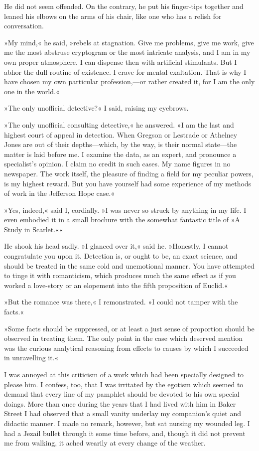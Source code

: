 He did not seem offended. On the contrary, he put his finger-tips together and leaned his elbows on the arms of his chair, like one who has a relish for conversation.

»My mind,« he said, »rebels at stagnation. Give me problems, give me work, give me the most abstruse cryptogram or the most intricate analysis, and I am in my own proper atmosphere. I can dispense then with artificial stimulants. But I abhor the dull routine of existence. I crave for mental exaltation. That is why I have chosen my own particular profession,—or rather created it, for I am the only one in the world.«

»The only unofficial detective?« I said, raising my eyebrows.

»The only unofficial consulting detective,« he answered. »I am the last and highest court of appeal in detection. When Gregson or Lestrade or Athelney Jones are out of their depths—which, by the way, is their normal state—the matter is laid before me. I examine the data, as an expert, and pronounce a specialist's opinion. I claim no credit in such cases. My name figures in no newspaper. The work itself, the pleasure of finding a field for my peculiar powers, is my highest reward. But you have yourself had some experience of my methods of work in the Jefferson Hope case.«

»Yes, indeed,« said I, cordially. »I was never so struck by anything in my life. I even embodied it in a small brochure with the somewhat fantastic title of »A Study in Scarlet.««

He shook his head sadly. »I glanced over it,« said he. »Honestly, I cannot congratulate you upon it. Detection is, or ought to be, an exact science, and should be treated in the same cold and unemotional manner. You have attempted to tinge it with romanticism, which produces much the same effect as if you worked a love-story or an elopement into the fifth proposition of Euclid.«

»But the romance was there,« I remonstrated. »I could not tamper with the facts.«

»Some facts should be suppressed, or at least a just sense of proportion should be observed in treating them. The only point in the case which deserved mention was the curious analytical reasoning from effects to causes by which I succeeded in unravelling it.«

I was annoyed at this criticism of a work which had been specially designed to please him. I confess, too, that I was irritated by the egotism which seemed to demand that every line of my pamphlet should be devoted to his own special doings. More than once during the years that I had lived with him in Baker Street I had observed that a small vanity underlay my companion's quiet and didactic manner. I made no remark, however, but sat nursing my wounded leg. I had a Jezail bullet through it some time before, and, though it did not prevent me from walking, it ached wearily at every change of the weather.

